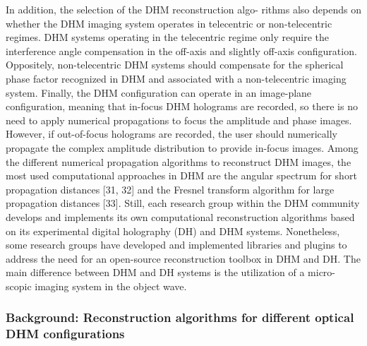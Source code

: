 In addition, the selection of the DHM reconstruction algo-
rithms also depends on whether the DHM imaging system operates in telecentric or non-telecentric regimes.
 DHM systems operating in the telecentric regime only require the interference angle compensation in the off-axis and slightly off-axis configuration.
Oppositely, non-telecentric DHM systems should compensate for the spherical phase factor recognized in
DHM and associated with a non-telecentric imaging system. Finally, the DHM configuration can operate in an image-plane configuration, meaning that in-focus DHM holograms
are recorded, so there is no need to apply numerical propagations to focus the amplitude and
phase images. However, if out-of-focus holograms are recorded, the user should numerically
propagate the complex amplitude distribution to provide in-focus images. Among the different
numerical propagation algorithms to reconstruct DHM images, the most used computational
approaches in DHM are the angular spectrum for short propagation distances [31, 32] and the
Fresnel transform algorithm for large propagation distances [33].
Still, each research group within the DHM community develops and implements its own
computational reconstruction algorithms based on its experimental digital holography (DH)
and DHM systems. Nonetheless, some research groups have developed and implemented
libraries and plugins to address the need for an open-source reconstruction toolbox in DHM
and DH. The main difference between DHM and DH systems is the utilization of a micro-
scopic imaging system in the object wave. 

\subsubsection{Background: Reconstruction algorithms for different optical
DHM configurations}

